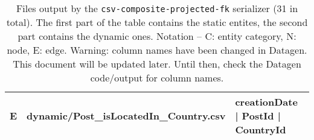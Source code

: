 \begin{table}[htb]
\begin{tabularx}{\linewidth}{|c|l|X|}
        E                    & dynamic/Post\_isLocatedIn\_Country.csv          & creationDate | PostId | CountryId \\
        \hline
    \end{tabularx}
    \caption{Files output by the \texttt{csv-composite-projected-fk} serializer (31 in total). The first part of the table contains the static entites, the second part contains the dynamic ones. Notation -- C: entity category, N: node, E: edge. Warning: column names have been changed in Datagen. This document will be updated later. Until then, check the Datagen code/output for column names.}
    \label{table:csv-composite-projected-fk}
\end{table}
